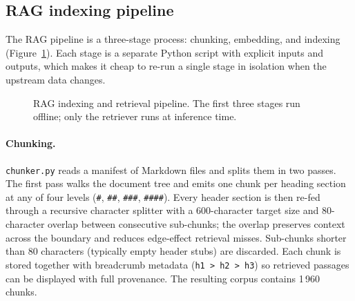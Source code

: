\subsection{RAG indexing pipeline}

The RAG pipeline is a three-stage process: chunking, embedding, and indexing
(Figure~\ref{fig:rag_pipeline}). Each stage is a separate Python script with explicit
inputs and outputs, which makes it cheap to re-run a single stage in isolation when the
upstream data changes.

\begin{figure}[h]
\centering
{}
\caption{RAG indexing and retrieval pipeline. The first three stages run offline; only the
retriever runs at inference time.}
\label{fig:rag_pipeline}
\end{figure}

\paragraph{Chunking.}
\texttt{chunker.py} reads a manifest of Markdown files and splits them in two passes. The
first pass walks the document tree and emits one chunk per heading section at any of four
levels (\texttt{\#}, \texttt{\#\#}, \texttt{\#\#\#}, \texttt{\#\#\#\#}). Every header section
is then re-fed through a recursive character splitter with a 600-character target size and
80-character overlap between consecutive sub-chunks; the overlap preserves context across
the boundary and reduces edge-effect retrieval misses. Sub-chunks shorter than 80 characters
(typically empty header stubs) are discarded. Each chunk is stored together with breadcrumb
metadata (\texttt{h1 > h2 > h3}) so retrieved passages can be displayed with full provenance.
The resulting corpus contains 1\,960 chunks.

